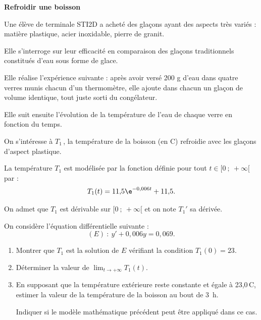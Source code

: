 \begin{center}
\textbf{Refroidir une boisson}
\end{center}

Une élève de terminale STI2D a acheté des glaçons ayant des aspects très variés : matière plastique, acier inoxidable, pierre de granit.

Elle s'interroge sur leur efficacité en comparaison des glaçons traditionnels constitués d'eau sous forme de glace.

Elle réalise l'expérience suivante : après avoir versé 200 g d'eau dans quatre verres munis chacun d'un thermomètre, elle ajoute dans chacun un glaçon de volume identique, tout juste sorti du congélateur.

Elle suit ensuite l'évolution de la température de l'eau de chaque verre en fonction du temps.

\medskip

On s'intéresse à $T_1$\,, la température de la boisson (en \textdegree{}C) refroidie avec les glaçons d'aspect plastique.

La température $T_1$ est modélisée par la fonction définie pour tout $t \in [0~;~+\infty[$ par :
\[T_1(t) = 11{,}5\e^{-0{,}006t} + 11{,}5.\]

On admet que $T_1$ est dérivable sur $[0~;~+\infty[$ et on note $T_1'$ sa dérivée.

On considère l'équation différentielle suivante :
\[(E)~:~y' + 0{,}006y = 0{,}069.\]

\begin{enumerate}[start=4]
\item Montrer que $T_1$ est la solution de $E$ vérifiant la condition $T_1(0) = 23$.

\item Déterminer la valeur de $\displaystyle \lim_{t\to +\infty} T_1(t)$.

\item En supposant que la température extérieure reste constante et égale à 23,0\,\textdegree{}C, estimer la valeur de la température de la boisson au bout de 3~h.

Indiquer si le modèle mathématique précédent peut être appliqué dans ce cas.
\end{enumerate}
